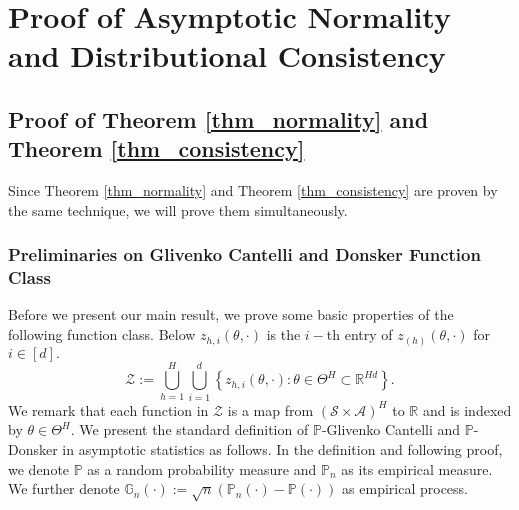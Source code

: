 \documentclass{article}
\numberwithin{equation}{section}
\theoremstyle{plain}
\theoremstyle{definition}
\theoremstyle{remark}
\begin{document}
\section{Proof of Asymptotic Normality and Distributional Consistency}
\subsection{Proof of Theorem \ref{thm_normality} and Theorem \ref{thm_consistency}}
Since Theorem \ref{thm_normality} and Theorem \ref{thm_consistency} are proven by the same technique, we will prove them simultaneously.

\subsubsection{Preliminaries on Glivenko Cantelli and Donsker Function Class}\label{sec:prep}
Before we present our main result, we prove some basic properties of the following function class. Below $z_{h,i}(\theta,\cdot)$ is the $i-$th entry of $z_{(h)}(\theta,\cdot)$ for $i \in [d].$
\begin{equation}\label{definition_Z}
    \mathcal{Z} := \bigcup_{h=1}^{H} \bigcup_{i=1}^{d} \left\{z_{h,i}\left(\theta,\cdot\right): \theta \in \Theta^H \subset \mathbb{R}^{Hd} \right\}.
\end{equation}
We remark that each function in $\mathcal{Z}$ is a map from $( \mathcal{S} \times \mathcal{A} )^H$ to $\mathbb{R}$ and is indexed by $\theta \in \Theta^H.$ We present the standard definition of $\mathbb{P}$-Glivenko Cantelli and $\mathbb{P}$-Donsker in asymptotic statistics as follows. In the definition and following proof, we denote $\mathbb{P}$ as a random probability measure and $\mathbb{P}_n$ as its empirical measure. We further denote $\mathbb{G}_n(\cdot) := \sqrt{n} \left(\mathbb{P}_n(\cdot) - \mathbb{P}(\cdot)\right)$ as empirical process.
\end{document}
